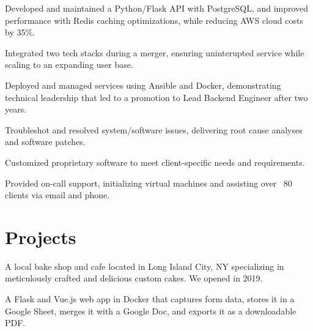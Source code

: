 \documentclass[]{plushcv}
\begin{document}
\begin{minipage}[t]{0.70\textwidth}
\begin{tightemize}
\sectionsep
\item Developed and maintained a Python/Flask API with PostgreSQL, and improved performance with Redis caching optimizations, while reducing AWS cloud costs by 35\%.
\item Integrated two tech stacks during a merger, ensuring uninterupted service while scaling to an expanding user base.
\item Deployed and managed services using Ansible and Docker, demonstrating technical leadership that led to a promotion to Lead Backend Engineer after two years.
\end{tightemize}
\sectionsep

\begin{tightemize}
\sectionsep
\item Troubleshot and resolved system/software issues, delivering root cause analyses and software patches.
\item Customized proprietary software to meet client-specific needs and requirements.
\item Provided on-call support, initializing virtual machines and assisting over ~80 clients via email and phone.
\end{tightemize}



\section{Projects}

\begin{tightemize}
\item A local bake shop and cafe located in Long Island City, NY specializing in meticulously crafted and delicious custom cakes. We opened in 2019.
\end{tightemize}
\sectionsep

\begin{tightemize}
\item A Flask and Vue.js web app in Docker that captures form data, stores it in a Google Sheet, merges it with a Google Doc, and exports it as a downloadable PDF.
\end{tightemize}
\sectionsep


\end{minipage}
\end{document}
